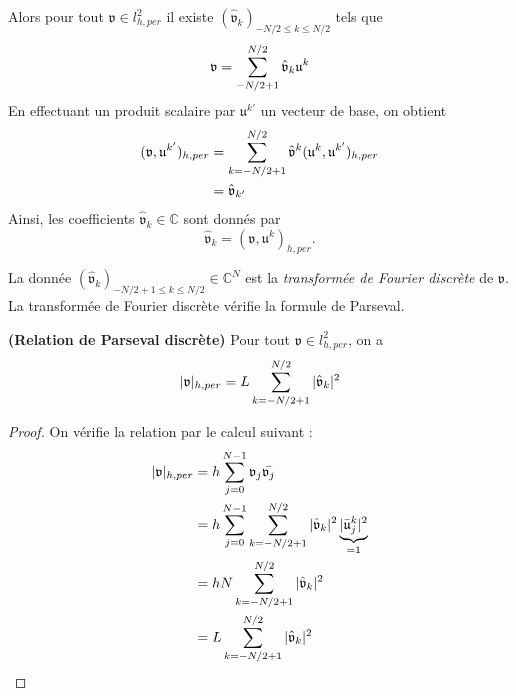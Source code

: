 Alors pour tout $\mathfrak{v} \in l^2_{h,per}$ il existe $(\hat{\mathfrak{v}}_k )_{-N/2 \leq k \leq N/2}$ tels que 
\begin{equation}
\mathfrak{v} = \displaystyle\sum\limits_{-N/2+1}^{N/2} \hat{\mathfrak{v}}_k \mathfrak{u}^k
\end{equation}
En effectuant un produit scalaire par $\mathfrak{u}^{k'}$ un vecteur de base, on obtient
\begin{align*}
(\mathfrak{v}, \mathfrak{u}^{k'})_{h,per} & = \displaystyle\sum\limits_{k=-N/2+1}^{N/2} \hat{\mathfrak{v}}^k (\mathfrak{u}^k, \mathfrak{u}^{k'})_{h,per} \\
		& = \hat{\mathfrak{v}}_{k'}
\end{align*}
Ainsi, les coefficients $\hat{\mathfrak{v}}_{k} \in \mathbb{C}$ sont donnés par
\begin{equation}
\hat{\mathfrak{v}}_{k} = (\mathfrak{v}, \mathfrak{u}^{k})_{h,per}.
\end{equation}

La donnée $(\hat{\mathfrak{v}}_{k})_{-N/2+1 \leq k \leq N/2} \in \mathbb{C}^N$ est la \textit{transformée de Fourier discrète} de $\mathfrak{v}$. La transformée de Fourier discrète vérifie la formule de Parseval.

\begin{proposition}
\textbf{(Relation de Parseval discrète)} 
Pour tout $\mathfrak{v} \in l^2_{h,per}$, on a 
\begin{equation}
|\mathfrak{v}|_{h,per} = L \displaystyle\sum\limits_{k=-N/2+1}^{N/2} |\hat{\mathfrak{v}}_k|^2
\end{equation}
\end{proposition}

\begin{proof}
On vérifie la relation par le calcul suivant :
\begin{align*}
|\mathfrak{v}|_{h,per} & = h \displaystyle\sum\limits_{j=0}^{N-1} \mathfrak{v}_j \bar{\mathfrak{v}_j} \\
	& = h \displaystyle\sum\limits_{j=0}^{N-1} \displaystyle\sum\limits_{k=-N/2+1}^{N/2} |\hat{\mathfrak{v}}_k|^2 \underbrace{|\bar{\mathfrak{u}}_j^k|^2}_{=1}\\
	& = h N \displaystyle\sum\limits_{k=-N/2+1}^{N/2} |\hat{\mathfrak{v}}_k|^2 \\
	& = L \displaystyle\sum\limits_{k=-N/2+1}^{N/2} |\hat{\mathfrak{v}}_k|^2
\end{align*}
\end{proof}















